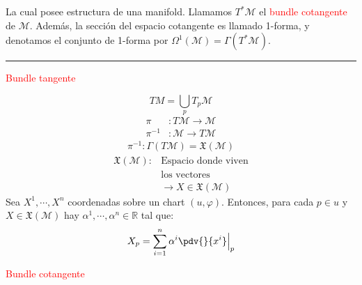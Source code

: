 \documentclass[../main]{subfiles}
\begin{document}
\begin{adjustwidth}{0pt}{-100pt}
La cual posee estructura de una manifold. Llamamos $T^{*}\mathcal{M}$ el \textcolor{red}{bundle cotangente} de $\mathcal{M}$. Además, la sección del espacio cotangente es llamado 1-forma, y denotamos el conjunto de 1-forma por $\Omega^1(\mathcal{M})=\Gamma(T^{*}\mathcal{M})$.
\vspace{1cm}
\hrule

\begin{minipage}[t]{0.5\textwidth}
\begin{adjustwidth}{0pt}{20pt}
    \centerline{\textcolor{red}{Bundle tangente}}
    \begin{equation*}
        TM=\bigcup_p T_p \mathcal{M}
    \end{equation*}
    \vspace{-0.7cm}
    \begin{align*}
        \pi&: T\mathcal{M} \rightarrow \mathcal{M} \\
        \pi^{-1}&: \mathcal{M} \rightarrow T\mathcal{M}
    \end{align*}
    \vspace{-0.9cm}
    \begin{align*}
        \pi^{-1}: \Gamma(T\mathcal{M})=\mathfrak{X}(\mathcal{M})
    \end{align*}
    \vspace{-0.9cm}
    \begin{align*}
         \mathfrak{X}(\mathcal{M}): &\text{Espacio donde viven}\\
         &\text{los vectores}\\
         &\rightarrow X \in \mathfrak{X}(\mathcal{M})
    \end{align*}
    Sea $X^1, \cdots, X^n$ coordenadas sobre un chart $(u, \varphi)$. Entonces, para cada $p \in u$ y $X \in \mathfrak{X}(\mathcal{M})$ hay $\alpha^1, \cdots, \alpha^n \in \mathbb{R}$ tal que:
    \begin{equation*}
        X_p=\sum_{i=1}^n \alpha^{i}\pdv{}{x^{i}}\Big{|}_p
    \end{equation*}
\end{adjustwidth}
\end{minipage}
    \hspace{0.01\textwidth} %
    \vrule %
    \hspace{0.01\textwidth} %
\begin{minipage}[t]{0.5\textwidth}
\begin{adjustwidth}{20pt}{0pt}
    \centerline{\textcolor{red}{Bundle cotangente}}

\end{adjustwidth}
\end{minipage}
\end{adjustwidth}
\end{document}

